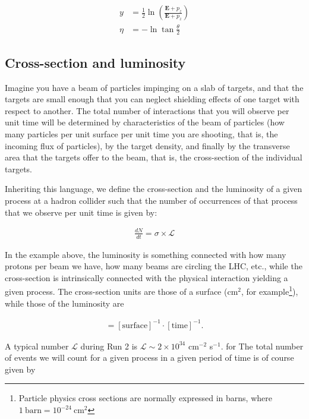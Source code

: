 \begin{align*}
y &= \frac{1}{2} \ln \left(\frac{\mathbf{E} + p_z}{\mathbf{E} + p_z} \right) \\
\eta &= -\ln \tan \frac{\theta}{2}
\end{align*}

\subsection{Cross-section and luminosity}
\label{sec:cross_section_lumi}

Imagine you have a beam of particles impinging on a slab of targets, and that the targets are small enough that you can neglect shielding effects of one target with respect to another. The total number of interactions that you will observe per unit time will be determined by characteristics of the beam of particles (how many particles per unit surface per unit time you are shooting, that is, the incoming flux of particles), by the target density, and finally by the transverse area that the targets offer to the beam, that is, the cross-section of the individual targets. 

Inheriting this language, we define the cross-section and the luminosity of a given process at a hadron collider such that the number of occurrences of that process that we observe per unit time is given by: 

\begin{align*}
\frac{dN}{dt} = \sigma \times \mathcal{L}
\end{align*} 

In the example above, the luminosity is something connected with how many protons per beam we have, how many beams are circling the LHC, etc., while the cross-section is intrinsically connected with the physical interaction yielding a given process. The cross-section units are those of a surface (cm$^2$, for example\footnote{Particle physics cross sections are normally expressed in barns, where $1\ \mathrm{barn} = 10^{-24}\ \mathrm{cm}^2$}), while those of the luminosity are

\begin{align*}
[\mathcal{L}] =  [\mathrm{surface}]^{-1}\cdot [\mathrm{time}]^{-1}.
\end{align*}

A typical number $\mathcal{L}$ during Run 2 is $\mathcal{L} \sim 2\times 10^{34}$ cm$^{-2}$ s$^{-1}$. for The total number of events we will count for a given process in a given period of time is of course given by 

